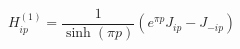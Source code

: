 \begin{equation}
H_{ip}^{\left( 1\right) }=\frac{1}{\sinh\left(
\pi p\right)} \left( e^{\pi p}J_{ip}-J_{-ip}\right)
\label{H1}\end{equation}

